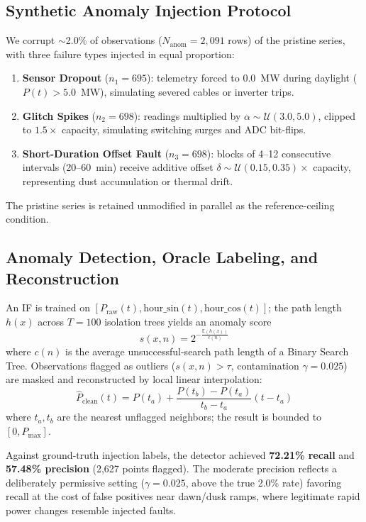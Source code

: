 \documentclass[conference]{IEEEtran}
\begin{document}
\subsection{Synthetic Anomaly Injection Protocol}
We corrupt $\sim$2.0\% of observations ($N_{\text{anom}} = 2{,}091$ rows) of the pristine series, with three failure types injected in equal proportion:
\begin{enumerate}
    \item \textbf{Sensor Dropout} ($n_1 = 695$): telemetry forced to $0.0$~MW during daylight ($P(t) > 5.0$~MW), simulating severed cables or inverter trips.
    \item \textbf{Glitch Spikes} ($n_2 = 698$): readings multiplied by $\alpha \sim \mathcal{U}(3.0, 5.0)$, clipped to $1.5\times$ capacity, simulating switching surges and ADC bit-flips.
    \item \textbf{Short-Duration Offset Fault} ($n_3 = 698$): blocks of 4--12 consecutive intervals (20--60~min) receive additive offset $\delta \sim \mathcal{U}(0.15, 0.35)\times$ capacity, representing dust accumulation or thermal drift.
\end{enumerate}
The pristine series is retained unmodified in parallel as the reference-ceiling condition.
\vspace{5pt}
\subsection{Anomaly Detection, Oracle Labeling, and Reconstruction}
An IF is trained on $[P_{\text{raw}}(t), \text{hour\_sin}(t), \text{hour\_cos}(t)]$; the path length $h(x)$ across $T=100$ isolation trees yields an anomaly score
\begin{equation}
s(x, n) = 2^{-\frac{\mathbb{E}(h(x))}{c(n)}}
\end{equation}
where $c(n)$ is the average unsuccessful-search path length of a Binary Search Tree. Observations flagged as outliers ($s(x,n) > \tau$, contamination $\gamma = 0.025$) are masked and reconstructed by local linear interpolation:
\begin{equation}
\hat{P}_{\text{clean}}(t) = P(t_a) + \frac{P(t_b) - P(t_a)}{t_b - t_a}(t - t_a)
\end{equation}
where $t_a, t_b$ are the nearest unflagged neighbors; the result is bounded to $[0, P_{\text{max}}]$.

Against ground-truth injection labels, the detector achieved \textbf{72.21\% recall} and \textbf{57.48\% precision} (2{,}627 points flagged). The moderate precision reflects a deliberately permissive setting ($\gamma=0.025$, above the true 2.0\% rate) favoring recall at the cost of false positives near dawn/dusk ramps, where legitimate rapid power changes resemble injected faults.
\end{document}
